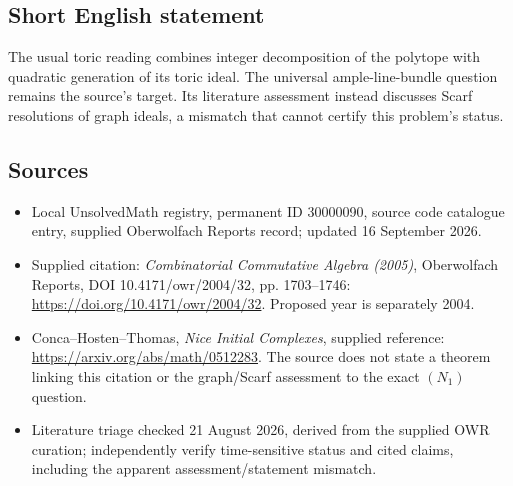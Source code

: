 \documentclass[11pt]{article}
\begin{document}
\subsection{Short English statement}
The usual toric reading combines integer decomposition of the polytope with quadratic generation of its toric ideal. The universal ample-line-bundle question remains the source’s target. Its literature assessment instead discusses Scarf resolutions of graph ideals, a mismatch that cannot certify this problem’s status.
\subsection{Sources}
\begin{itemize}
\item Local UnsolvedMath registry, permanent ID 30000090, source code catalogue entry, supplied Oberwolfach Reports record; updated 16 September 2026.
\item Supplied citation: \emph{Combinatorial Commutative Algebra (2005)}, Oberwolfach Reports, DOI 10.4171/owr/2004/32, pp. 1703--1746: \url{https://doi.org/10.4171/owr/2004/32}. Proposed year is separately 2004.
\item Conca--Hosten--Thomas, \emph{Nice Initial Complexes}, supplied reference: \url{https://arxiv.org/abs/math/0512283}. The source does not state a theorem linking this citation or the graph/Scarf assessment to the exact $(N_1)$ question.
\item Literature triage checked 21 August 2026, derived from the supplied OWR curation; independently verify time-sensitive status and cited claims, including the apparent assessment/statement mismatch.
\end{itemize}
\end{document}
